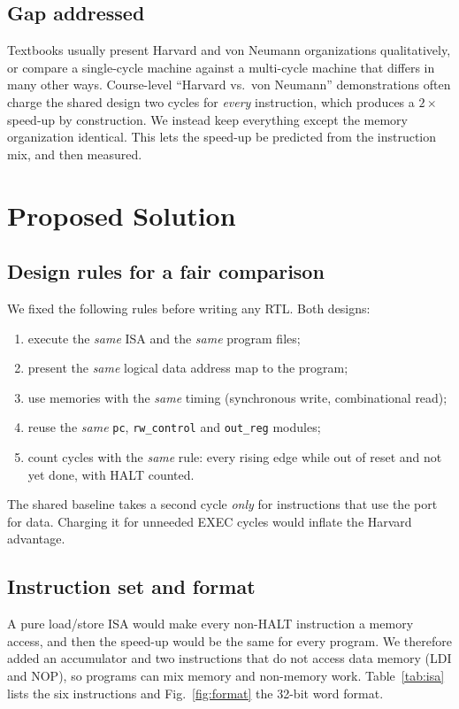\documentclass[conference]{IEEEtran}
\newcommand{\sig}[1]{\texttt{\small #1}}
\begin{document}
\subsection{Gap addressed}
Textbooks usually present Harvard and von Neumann organizations qualitatively, or compare a single-cycle machine against a multi-cycle machine that differs in many other ways. Course-level ``Harvard vs.\ von Neumann'' demonstrations often charge the shared design two cycles for \emph{every} instruction, which produces a $2\times$ speed-up by construction. We instead keep everything except the memory organization identical. This lets the speed-up be predicted from the instruction mix, and then measured.

\section{Proposed Solution}\label{sec:proposed}

\subsection{Design rules for a fair comparison}\label{sec:rules}
We fixed the following rules before writing any RTL. Both designs:
\begin{enumerate}
\item execute the \emph{same} ISA and the \emph{same} program files;
\item present the \emph{same} logical data address map to the program;
\item use memories with the \emph{same} timing (synchronous write, combinational read);
\item reuse the \emph{same} \sig{pc}, \sig{rw\_control} and \sig{out\_reg} modules;
\item count cycles with the \emph{same} rule: every rising edge while out of reset and not yet done, with HALT counted.
\end{enumerate}
The shared baseline takes a second cycle \emph{only} for instructions that use the port for data. Charging it for unneeded EXEC cycles would inflate the Harvard advantage.

\subsection{Instruction set and format}
A pure load/store ISA would make every non-HALT instruction a memory access, and then the speed-up would be the same for every program. We therefore added an accumulator and two instructions that do not access data memory (LDI and NOP), so programs can mix memory and non-memory work. Table~\ref{tab:isa} lists the six instructions and Fig.~\ref{fig:format} the 32-bit word format.
\end{document}
